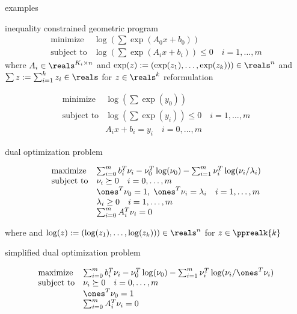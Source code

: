\documentclass[17pt,landscape]{foils}
\begin{document}
{\bit
\item
	examples
	\bit
	\item
		inequality constrained geometric program
		$$
			\begin{array}{ll}
				\mbox{minimize} &
					\log\left(\sum \exp(A_0x + b_0)\right)
				\\
				\mbox{subject to} &
					\log\left(\sum \exp(A_ix + b_i)\right)\leq 0\quad i=1,\ldots,m
			\end{array}
		$$
		where $A_i\in\reals^{K_i\times n}$
		and $\exp(z) := (\exp(z_1),\ldots,\exp(z_k)))\in\reals^n$
		and $\sum z := \sum_{i=1}^k z_i\in\reals$
		for $z\in\reals^k$
		\bit
		\vfill
		\iitem
			reformulation

			$$
				\begin{array}{ll}
					\mbox{minimize} &
						\log\left(\sum \exp(y_0)\right)
					\\
					\mbox{subject to} &
						\log\left(\sum \exp(y_i)\right)\leq 0\quad i=1,\ldots,m
					\\ &
						A_i x + b_i = y_i \quad i=0,\ldots,m
				\end{array}
			$$

		\vfill
		\iitem
			dual optimization problem

			$$
				\begin{array}{ll}
					\mbox{maximize} &
						\sum_{i=0}^m b_i^T \nu_i
						- \nu_0^T\log(\nu_0)
						- \sum_{i=1}^m \nu_i^T\log(\nu_i/\lambda_i)
					\\
					\mbox{subject to} &
						\nu_i \succeq 0\quad i=0,\ldots,m
					\\ &
						\ones^T \nu_0 = 1,\; \ones^T\nu_i=\lambda_i\quad i=1,\ldots,m
					\\ &
						\lambda_i\geq 0 \quad i=1,\ldots,m
					\\ &
						\sum_{i=0}^m A_i^T\nu_i = 0
				\end{array}
			$$

			where
			and $\log(z) := (\log(z_1),\ldots,\log(z_k)))\in\reals^n$
			for $z\in\pprealk{k}$

		\vfill
		\iitem
			simplified dual optimization problem

			$$
				\begin{array}{ll}
					\mbox{maximize} &
						\sum_{i=0}^m b_i^T \nu_i
						- \nu_0^T\log(\nu_0)
						- \sum_{i=1}^m \nu_i^T\log(\nu_i/\ones^T\nu_i)
					\\
					\mbox{subject to} &
						\nu_i \succeq 0\quad i=0,\ldots,m
					\\ &
						\ones^T \nu_0 = 1
					\\ &
						\sum_{i=0}^m A_i^T\nu_i = 0
				\end{array}
			$$
		\eit
	\eit
\eit
\vfill


}
\end{document}

